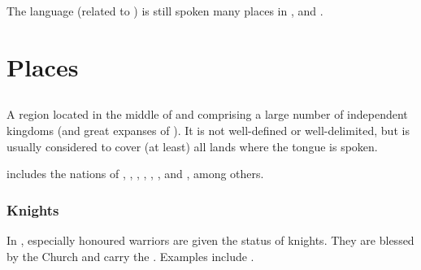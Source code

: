 The \Tepharin{} language (related to ) is still spoken many places in ,  and . 
\also{\Tepharae}







































\chapter{Places}















\section{\Velcad}
\index{\Velcad}
A region located in the middle of  and comprising a large number of independent kingdoms (and great expanses of \Wylde{}). 
It is not well-defined or well-delimited, but is usually considered to cover (at least) all lands where the \Velcadian{} tongue is spoken. 


\Velcad{} includes the nations of , , , , , ,  and , among others. 









\subsection{Knights}
In , especially honoured warriors are given the status of knights. They are blessed by the  Church and carry the  \quo{\rah}. 
Examples include . 

